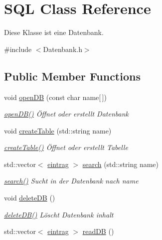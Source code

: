 \hypertarget{classSQL}{\section{\-S\-Q\-L \-Class \-Reference}
\label{classSQL}
}


\-Diese \-Klasse ist eine \-Datenbank.  




{\ttfamily \#include $<$\-Datenbank.\-h$>$}

\subsection*{\-Public \-Member \-Functions}
\begin{DoxyCompactItemize}
\item 
void \hyperlink{classSQL_a415575721f2281b4bc288faa73ce6011}{open\-D\-B} (const char name\mbox{[}$\,$\mbox{]})
\begin{DoxyCompactList}\small\item\em \hyperlink{classSQL_a415575721f2281b4bc288faa73ce6011}{open\-D\-B()} Öffnet oder erstellt \-Datenbank \end{DoxyCompactList}\item 
void \hyperlink{classSQL_a6866e844fde29db8f086caac0ade9d3e}{create\-Table} (std\-::string name)
\begin{DoxyCompactList}\small\item\em \hyperlink{classSQL_a6866e844fde29db8f086caac0ade9d3e}{create\-Table()} Öffnet oder erstellt \-Tabelle \end{DoxyCompactList}\item 
std\-::vector$<$ \hyperlink{structeintrag}{eintrag} $>$ \hyperlink{classSQL_a26f50151169012d6285b981bd4323788}{search} (std\-::string name)
\begin{DoxyCompactList}\small\item\em \hyperlink{classSQL_a26f50151169012d6285b981bd4323788}{search()} \-Sucht in der \-Datenbank nach name \end{DoxyCompactList}\item 
void \hyperlink{classSQL_ab4eb1456c40d46348ad8af25b1f1b832}{delete\-D\-B} ()
\begin{DoxyCompactList}\small\item\em \hyperlink{classSQL_ab4eb1456c40d46348ad8af25b1f1b832}{delete\-D\-B()} \-Löscht \-Datenbank inhalt \end{DoxyCompactList}\item 
std\-::vector$<$ \hyperlink{structeintrag}{eintrag} $>$ \hyperlink{classSQL_ae0e1ee968392140fc06d1855e5934bd0}{read\-D\-B} ()

\end{DoxyCompactItemize}
